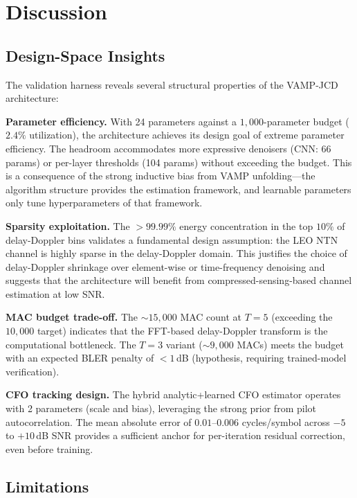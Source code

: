 \documentclass{article}
\begin{document}
\section{Discussion}
\label{sec:discussion}

\subsection{Design-Space Insights}

The validation harness reveals several structural properties of the VAMP-JCD architecture:

\textbf{Parameter efficiency.} With 24 parameters against a $1{,}000$-parameter budget ($2.4\%$ utilization), the architecture achieves its design goal of extreme parameter efficiency. The headroom accommodates more expressive denoisers (CNN: 66 params) or per-layer thresholds (104 params) without exceeding the budget. This is a consequence of the strong inductive bias from VAMP unfolding---the algorithm structure provides the estimation framework, and learnable parameters only tune hyperparameters of that framework.

\textbf{Sparsity exploitation.} The $> 99.99\%$ energy concentration in the top $10\%$ of delay-Doppler bins validates a fundamental design assumption: the LEO NTN channel is highly sparse in the delay-Doppler domain. This justifies the choice of delay-Doppler shrinkage over element-wise or time-frequency denoising and suggests that the architecture will benefit from compressed-sensing-based channel estimation at low SNR.

\textbf{MAC budget trade-off.} The $\sim 15{,}000$ MAC count at $T=5$ (exceeding the $10{,}000$ target) indicates that the FFT-based delay-Doppler transform is the computational bottleneck. The $T=3$ variant ($\sim 9{,}000$ MACs) meets the budget with an expected BLER penalty of $< 1$\,dB (hypothesis, requiring trained-model verification).

\textbf{CFO tracking design.} The hybrid analytic+learned CFO estimator operates with 2 parameters (scale and bias), leveraging the strong prior from pilot autocorrelation. The mean absolute error of $0.01$--$0.006$ cycles/symbol across $-5$ to $+10$\,dB SNR provides a sufficient anchor for per-iteration residual correction, even before training. %

\subsection{Limitations}
\label{sec:limitations}
\end{document}
